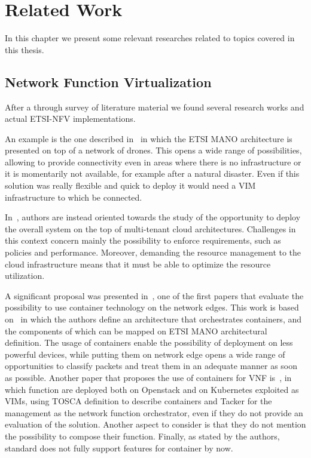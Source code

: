\chapter{Related Work}
\label{chap:rel_wk}

In this chapter we present some relevant researches related to topics covered
in this thesis. 

\section{Network Function Virtualization}
After a through survey of literature material we found several research works
and actual ETSI-NFV implementations.

An example is the one described in~\cite{nogales2018nfv} in
which the ETSI MANO architecture is presented on top of a network of drones.
This opens a wide range of possibilities, allowing to provide connectivity even
in areas where there is no infrastructure or it is momentarily not
available, for example after a natural disaster. Even if this solution was
really flexible and quick to deploy it would need a VIM infrastructure to which
be connected.

In~\cite{yu2015network}, authors are instead oriented towards the study of the
opportunity to deploy the overall system on the top of multi-tenant cloud
architectures. Challenges in this context concern mainly the possibility to
enforce requirements, such as policies and performance. Moreover, demanding the
resource management to the cloud infrastructure means that it must be able to
optimize the resource utilization.

A significant proposal was presented in~\cite{cziva2017container}, one
of the first papers that evaluate the possibility to use container technology on
the network edges. This work is based on~\cite{cziva2015container} in which the
authors define an architecture that orchestrates containers, and the components
of which can be mapped on ETSI MANO architectural definition. The usage of
containers enable the possibility of deployment on less powerful devices, while
putting them on network edge opens a wide range of opportunities to classify
packets and treat them in an adequate manner as soon as possible. Another paper
that proposes the use of containers for VNF is~\cite{hoang2018extended}, in
which function are deployed both on Openstack and on Kubernetes exploited as
VIMs, using TOSCA definition to describe containers and Tacker for the
management as the network function orchestrator, even if they do not provide an
evaluation of the solution. Another aspect to consider is that they do not
mention the possibility to compose their function. Finally, as stated by the
authors, standard does not fully support features for container by now.


